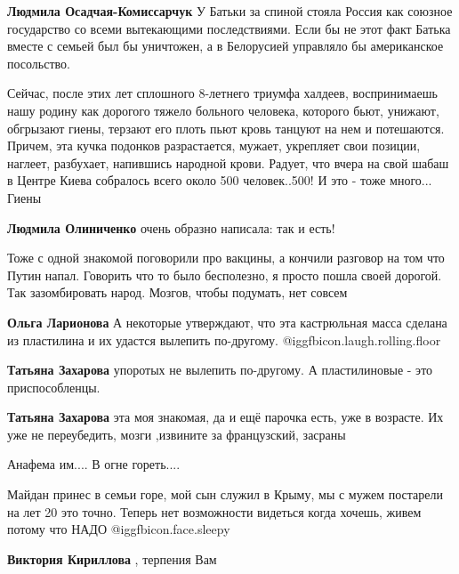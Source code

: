 \begin{itemize}
\begin{itemize}
\textbf{Людмила Осадчая-Комиссарчук} У Батьки за спиной стояла Россия как союзное государство со всеми вытекающими последствиями. Если бы не этот факт Батька вместе с семьей был бы уничтожен, а в Белорусией управляло бы американское посольство.


Сейчас, после этих лет сплошного 8-летнего триумфа халдеев, воспринимаешь нашу
родину как дорогого тяжело больного человека, которого бьют, унижают, обгрызают
гиены, терзают его плоть пьют кровь танцуют на нем и потешаются. Причем, эта
кучка подонков разрастается, мужает, укрепляет свои позиции, наглеет,
разбухает, напившись народной крови. Радует, что вчера на свой шабаш в Центре
Киева собралось всего около 500 человек..500! И это - тоже много... Гиены

\textbf{Людмила Олиниченко} очень образно написала: так и есть!

\end{itemize} %


Тоже с одной знакомой поговорили про вакцины, а кончили разговор на том что
Путин напал. Говорить что то было бесполезно, я просто пошла своей дорогой. Так
зазомбировать народ. Мозгов, чтобы подумать, нет совсем

\begin{itemize} %
\textbf{Ольга Ларионова} А некоторые утверждают, что эта кастрюльная масса сделана из пластилина и их удастся вылепить по-другому. @igg{fbicon.laugh.rolling.floor} 


\textbf{Татьяна Захарова} упоротых не вылепить по-другому. А пластилиновые - это приспособленцы.

\textbf{Татьяна Захарова} эта моя знакомая, да и ещё парочка есть, уже в возрасте. Их уже не переубедить, мозги ,извините за французский, засраны
\end{itemize} %

Анафема им....
В огне гореть....


Майдан принес в семьи горе, мой сын служил в Крыму, мы с мужем постарели на лет
20 это точно. Теперь нет возможности видеться когда хочешь, живем потому что
НАДО @igg{fbicon.face.sleepy} 

\begin{itemize} %
\textbf{Виктория Кириллова} , терпения Вам


\end{itemize}
\end{itemize}
